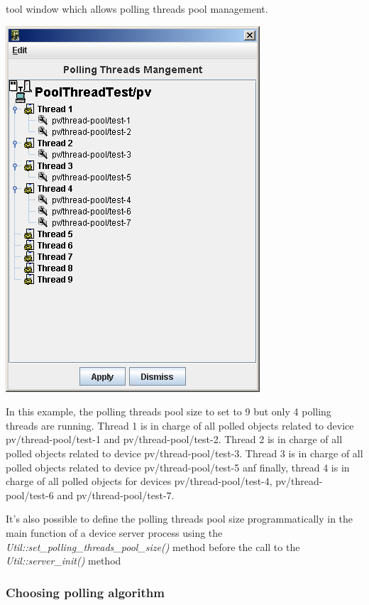 tool window which allows polling threads pool management.\begin{center}\includegraphics{advanced/ThreadsManagement}\end{center}

In this example, the polling threads pool size to set to 9 but only
4 polling threads are running. Thread 1 is in charge of all polled
objects related to device pv/thread-pool/test-1 and pv/thread-pool/test-2.
Thread 2 is in charge of all polled objects related to device pv/thread-pool/test-3.
Thread 3 is in charge of all polled objects related to device pv/thread-pool/test-5
anf finally, thread 4 is in charge of all polled objects for devices
pv/thread-pool/test-4, pv/thread-pool/test-6 and pv/thread-pool/test-7.

It's also possible to define the polling threads pool size programmatically
in the main function of a device server process using the \emph{Util::set\_polling\_threads\_pool\_size()}
method before the call to the \emph{Util::server\_init()} method


\subsubsection{Choosing polling algorithm}

